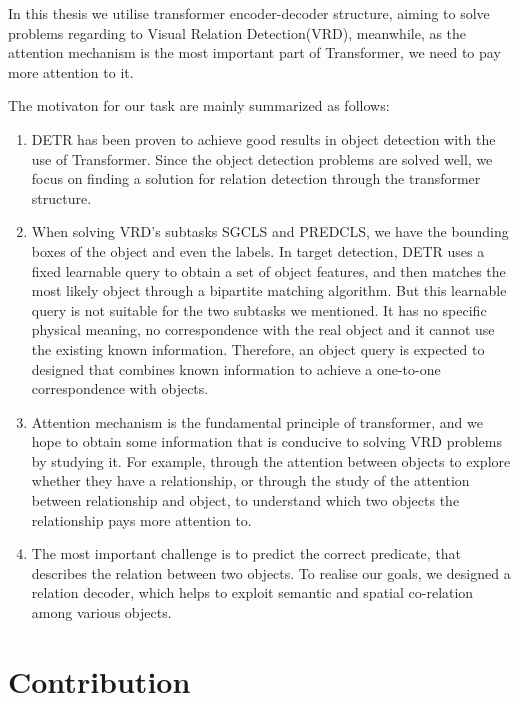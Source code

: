 In this thesis we utilise transformer encoder-decoder structure, aiming to solve problems regarding to Visual Relation Detection(VRD), meanwhile, as the attention mechanism is the most important part of Transformer, we need to pay more attention to it.

The motivaton for our task are mainly summarized as follows:

\begin{enumerate}[\qquad 1.]
	\item DETR has been proven to achieve good results in object detection with the use of Transformer. Since the object detection problems are solved well, we focus on finding a solution for relation detection through the transformer structure.
	\item When solving VRD's subtasks SGCLS and PREDCLS, we have the bounding boxes of the object and even the labels. In target detection, DETR uses a fixed learnable query to obtain a set of object features, and then matches the most likely object through a bipartite matching algorithm. But this learnable query is not suitable for the two subtasks we mentioned. It has no specific physical meaning, no correspondence with the real object and it cannot use the existing known information. Therefore, an object query is expected to designed that combines known information to achieve a one-to-one correspondence with objects.
	\item Attention mechanism is the fundamental principle of transformer, and we hope to obtain some information that is conducive to solving VRD problems by studying it. For example, through the attention between objects to explore whether they have a relationship, or through the study of the attention between relationship and object, to understand which two objects the relationship pays more attention to.
	\item The most important challenge is to predict the correct predicate, that describes the relation between two objects. To realise our goals, we designed a relation decoder, which helps to exploit semantic and spatial co-relation among various objects.
\end{enumerate}
 
 
\section{Contribution}

